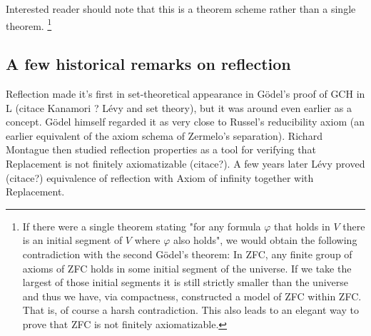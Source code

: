 \documentclass[12pt,a4paper]{article}
\begin{document}
\medskip 

Interested reader should note that this is a theorem scheme rather than a single theorem. \footnote{If there were a single theorem stating "for any formula $\varphi$ that holds in $V$ there is an initial segment of $V$ where $\varphi$ also holds", we would obtain the following contradiction with the second G{\"o}del's theorem: In ZFC, any finite group of axioms of ZFC holds in some initial segment of the universe. If we take the largest of those initial segments it is still strictly smaller than the universe and thus we have, via compactness, constructed a model of ZFC within ZFC. That is, of course a harsh contradiction. This also leads to an elegant way to prove that ZFC is not finitely axiomatizable.}

\medskip

\subsection{A few historical remarks on reflection}\label{sec:History}  %
 
 
Reflection made it's first in set-theoretical appearance in G{\"o}del's proof of GCH in L  (citace Kanamori ? Lévy and set theory), but it was around even earlier as a concept. G{\"o}del himself regarded it as very close to Russel's reducibility axiom (an earlier equivalent of the axiom schema of Zermelo's separation). Richard Montague then studied reflection properties as a tool for verifying that Replacement is not finitely axiomatizable (citace?). A few years later Lévy proved (citace?) equivalence of reflection with Axiom of infinity together with Replacement.
\end{document}

